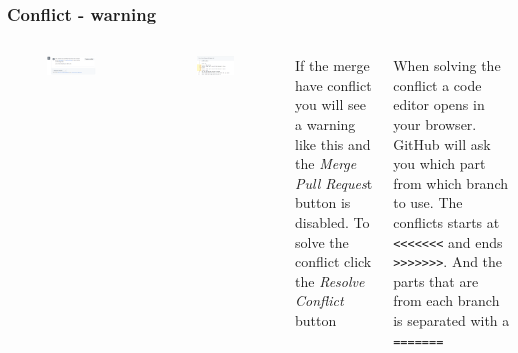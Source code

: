 \documentclass[aspectratio=169]{beamer} %
\begin{document}
\begin{frame}
	\frametitle{Conflict - warning}
	\begin{columns}[c]
		
		\vspace{-.6cm}
		\begin{figure}
			\centering
			\includegraphics[width=.9\textwidth]{./img/conflict-img-cant-merge.png}
		\end{figure}
		\vspace{-.3cm}
		\begin{figure}
			\centering
			\includegraphics[width=.9\textwidth]{./img/conflict-img-resolve-1.png}
		\end{figure}
		
		
		If the merge have conflict you will see a warning like this 
		and the \textit{Merge Pull Reques}t button is disabled. 
		To solve the conflict click the \textit{Resolve Conflict} button
		
		\vspace{.5cm}
		
		When solving the conflict a code editor opens in your browser. 
		GitHub will ask you which part from which branch to use. 
		The conflicts starts at \texttt{<<<<<<<} and ends \texttt{>>>>>>>}. 
		And the parts that are from each branch is separated with a \texttt{=======} 
		
	\end{columns}
\end{frame}
\end{document}
